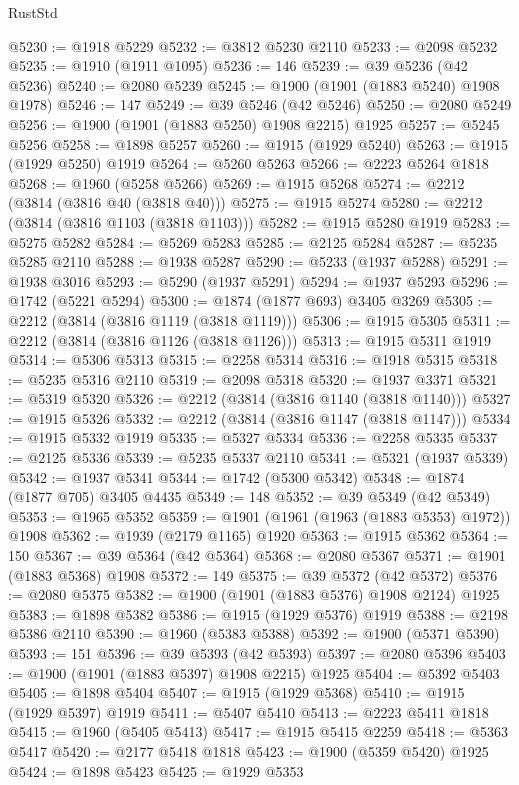 \begin{lexlean}{RustStd}
\begin{coremodule}
@5230 := @1918 @5229
@5232 := @3812 @5230 @2110
@5233 := @2098 @5232
@5235 := @1910 (@1911 @1095)
@5236 := 146
@5239 := @39 @5236 (@42 @5236)
@5240 := @2080 @5239
@5245 := @1900 (@1901 (@1883 @5240) @1908 @1978)
@5246 := 147
@5249 := @39 @5246 (@42 @5246)
@5250 := @2080 @5249
@5256 := @1900 (@1901 (@1883 @5250) @1908 @2215) @1925
@5257 := @5245 @5256
@5258 := @1898 @5257
@5260 := @1915 (@1929 @5240)
@5263 := @1915 (@1929 @5250) @1919
@5264 := @5260 @5263
@5266 := @2223 @5264 @1818
@5268 := @1960 (@5258 @5266)
@5269 := @1915 @5268
@5274 := @2212 (@3814 (@3816 @40 (@3818 @40)))
@5275 := @1915 @5274
@5280 := @2212 (@3814 (@3816 @1103 (@3818 @1103)))
@5282 := @1915 @5280 @1919
@5283 := @5275 @5282
@5284 := @5269 @5283
@5285 := @2125 @5284
@5287 := @5235 @5285 @2110
@5288 := @1938 @5287
@5290 := @5233 (@1937 @5288)
@5291 := @1938 @3016
@5293 := @5290 (@1937 @5291)
@5294 := @1937 @5293
@5296 := @1742 (@5221 @5294)
@5300 := @1874 (@1877 @693) @3405 @3269
@5305 := @2212 (@3814 (@3816 @1119 (@3818 @1119)))
@5306 := @1915 @5305
@5311 := @2212 (@3814 (@3816 @1126 (@3818 @1126)))
@5313 := @1915 @5311 @1919
@5314 := @5306 @5313
@5315 := @2258 @5314
@5316 := @1918 @5315
@5318 := @5235 @5316 @2110
@5319 := @2098 @5318
@5320 := @1937 @3371
@5321 := @5319 @5320
@5326 := @2212 (@3814 (@3816 @1140 (@3818 @1140)))
@5327 := @1915 @5326
@5332 := @2212 (@3814 (@3816 @1147 (@3818 @1147)))
@5334 := @1915 @5332 @1919
@5335 := @5327 @5334
@5336 := @2258 @5335
@5337 := @2125 @5336
@5339 := @5235 @5337 @2110
@5341 := @5321 (@1937 @5339)
@5342 := @1937 @5341
@5344 := @1742 (@5300 @5342)
@5348 := @1874 (@1877 @705) @3405 @4435
@5349 := 148
@5352 := @39 @5349 (@42 @5349)
@5353 := @1965 @5352
@5359 := @1901 (@1961 (@1963 (@1883 @5353) @1972)) @1908
@5362 := @1939 (@2179 @1165) @1920
@5363 := @1915 @5362
@5364 := 150
@5367 := @39 @5364 (@42 @5364)
@5368 := @2080 @5367
@5371 := @1901 (@1883 @5368) @1908
@5372 := 149
@5375 := @39 @5372 (@42 @5372)
@5376 := @2080 @5375
@5382 := @1900 (@1901 (@1883 @5376) @1908 @2124) @1925
@5383 := @1898 @5382
@5386 := @1915 (@1929 @5376) @1919
@5388 := @2198 @5386 @2110
@5390 := @1960 (@5383 @5388)
@5392 := @1900 (@5371 @5390)
@5393 := 151
@5396 := @39 @5393 (@42 @5393)
@5397 := @2080 @5396
@5403 := @1900 (@1901 (@1883 @5397) @1908 @2215) @1925
@5404 := @5392 @5403
@5405 := @1898 @5404
@5407 := @1915 (@1929 @5368)
@5410 := @1915 (@1929 @5397) @1919
@5411 := @5407 @5410
@5413 := @2223 @5411 @1818
@5415 := @1960 (@5405 @5413)
@5417 := @1915 @5415 @2259
@5418 := @5363 @5417
@5420 := @2177 @5418 @1818
@5423 := @1900 (@5359 @5420) @1925
@5424 := @1898 @5423
@5425 := @1929 @5353

\end{coremodule}
\end{lexlean}
